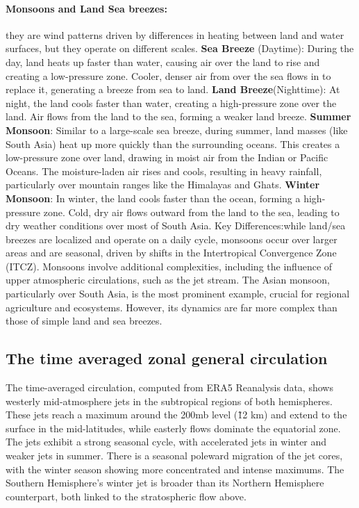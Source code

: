 \paragraph{Monsoons and Land Sea breezes:} they are wind patterns driven by differences in heating between land and water surfaces, but they operate on different scales.    
\newline \textbf{Sea Breeze} (Daytime): During the day, land heats up faster than water, causing air over the land to rise and creating a low-pressure zone. Cooler, denser air from over the sea flows in to replace it, generating a breeze from sea to land.
\newline \textbf{Land Breeze}(Nighttime): At night, the land cools faster than water, creating a high-pressure zone over the land. Air flows from the land to the sea, forming a weaker land breeze.
\newline \textbf{Summer Monsoon}: Similar to a large-scale sea breeze, during summer, land masses (like South Asia) heat up more quickly than the surrounding oceans. This creates a low-pressure zone over land, drawing in moist air from the Indian or Pacific Oceans. The moisture-laden air rises and cools, resulting in heavy rainfall, particularly over mountain ranges like the Himalayas and Ghats. 
\newline \textbf{Winter Monsoon}: In winter, the land cools faster than the ocean, forming a high-pressure zone. Cold, dry air flows outward from the land to the sea, leading to dry weather conditions over most of South Asia.
\newline Key Differences:while land/sea breezes are localized and operate on a daily cycle, monsoons occur over larger areas and are seasonal, driven by shifts in the Intertropical Convergence Zone (ITCZ).
Monsoons involve additional complexities, including the influence of upper atmospheric circulations, such as the jet stream.
The Asian monsoon, particularly over South Asia, is the most prominent example, crucial for regional agriculture and ecosystems. However, its dynamics are far more complex than those of simple land and sea breezes.

\subsection{The time averaged zonal general circulation}
The time-averaged circulation, computed from ERA5 Reanalysis data, shows westerly mid-atmosphere jets in the subtropical regions of both hemispheres. These jets reach a maximum around the 200mb level (\~12 km) and extend to the surface in the mid-latitudes, while easterly flows dominate the equatorial zone. The jets exhibit a strong seasonal cycle, with accelerated jets in winter and weaker jets in summer. There is a seasonal poleward migration of the jet cores, with the winter season showing more concentrated and intense maximums. The Southern Hemisphere's winter jet is broader than its Northern Hemisphere counterpart, both linked to the stratospheric flow above.

